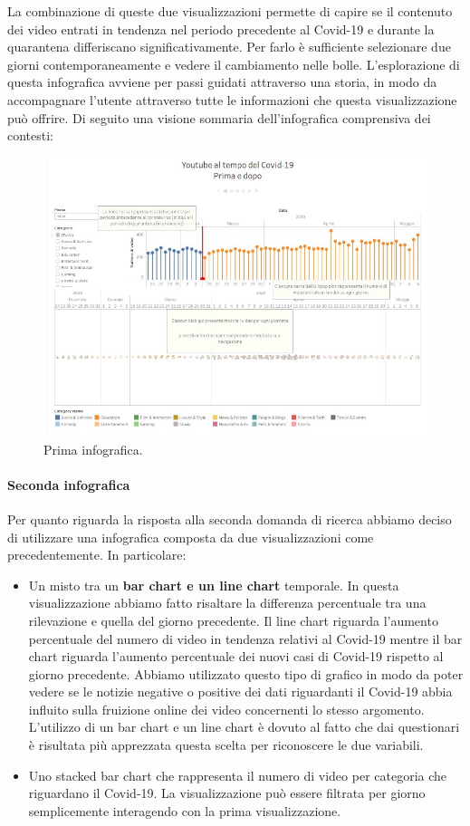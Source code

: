 \documentclass[10pt, a4paper,openany]{article}
\begin{document}
La combinazione di queste due visualizzazioni permette di capire se il contenuto dei video entrati in tendenza nel periodo precedente al Covid-19 e durante la quarantena differiscano significativamente. Per farlo è sufficiente selezionare due giorni contemporaneamente e vedere il cambiamento nelle bolle. L'esplorazione di questa infografica avviene per passi guidati attraverso una storia, in modo da accompagnare l'utente attraverso tutte le informazioni che questa visualizzazione può offrire. Di seguito una visione sommaria dell'infografica comprensiva dei contesti:
\begin{figure}[H]
	\centering
	\includegraphics[height=0.5 \linewidth]{pics/prima_infografica.png}
	\caption{Prima infografica.}
\end{figure}

\paragraph{Seconda infografica} Per quanto riguarda la risposta alla seconda domanda di ricerca abbiamo deciso di utilizzare una infografica composta da due visualizzazioni come precedentemente. In particolare:
\begin{itemize}
	\item Un misto tra un \textbf{bar chart e un line chart} temporale. In questa visualizzazione abbiamo fatto risaltare la differenza percentuale tra una rilevazione e quella del giorno precedente. Il line chart riguarda l'aumento percentuale del numero di video in tendenza relativi al Covid-19 mentre il bar chart riguarda l'aumento percentuale dei nuovi casi di Covid-19 rispetto al giorno precedente. 
	Abbiamo utilizzato questo tipo di grafico in modo da poter vedere se le notizie negative o positive dei dati riguardanti il Covid-19 abbia influito sulla fruizione online dei video concernenti lo stesso argomento.
	L'utilizzo di un bar chart e un line chart è dovuto al fatto che dai questionari è risultata più apprezzata questa scelta per riconoscere le due variabili.

	\item Uno stacked bar chart che rappresenta il numero di video per categoria che riguardano il Covid-19. La visualizzazione può essere filtrata per giorno semplicemente interagendo con la prima visualizzazione.
\end{itemize}
\end{document}
